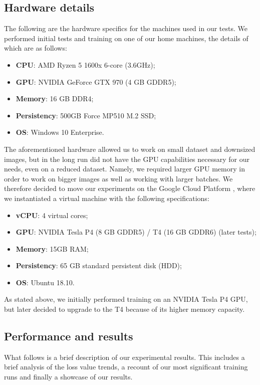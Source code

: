 \documentclass[twoside,twocolumn]{article}
\begin{document}
\subsection{Hardware details}

The following are the hardware specifics for the machines used in our tests. We performed initial tests and training on one of our home machines, the details of which are as follows:
\begin{itemize}
\item \textbf{CPU}: AMD Ryzen 5 1600x  6-core (3.6GHz);
\item \textbf{GPU}: NVIDIA GeForce GTX 970 (4 GB GDDR5);
\item \textbf{Memory}: 16 GB DDR4;
\item \textbf{Persistency}: 500GB Force MP510 M.2 SSD;
\item \textbf{OS}: Windows 10 Enterprise.
\end{itemize}

The aforementioned hardware allowed us to work on small dataset and downsized images, but in the long run did not have the GPU capabilities necessary for our needs, even on a reduced dataset. Namely, we required larger GPU memory in order to work on bigger images as well as working with larger batches. We therefore decided to move our experiments on the Google Cloud Platform \cite{GCP}, where we instantiated a virtual machine with the following specifications:

\begin{itemize}
	\item \textbf{vCPU}: 4 virtual cores;
	\item \textbf{GPU}: NVIDIA Tesla P4 (8 GB GDDR5) / T4 (16 GB GDDR6) (later tests);
	\item \textbf{Memory}: 15GB RAM;
	\item \textbf{Persistency}: 65 GB standard persistent disk (HDD);
	\item \textbf{OS}: Ubuntu 18.10.
\end{itemize}

As stated above, we initially performed training on an NVIDIA Tesla P4 GPU, but later decided to upgrade to the T4 because of its higher memory capacity.


\subsection{Performance and results}

What follows is a brief description of our experimental results. This includes a brief analysis of the loss value trends, a recount of our most significant training runs and finally a showcase of our results.
\end{document}
